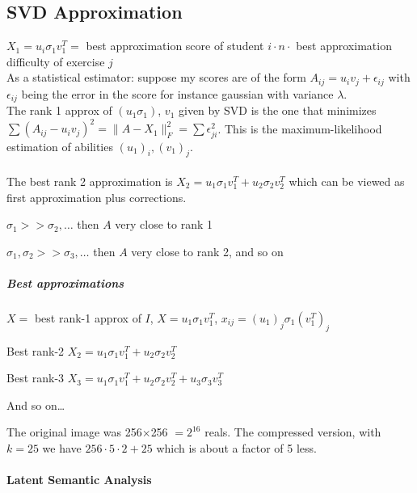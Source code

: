 \documentclass[10pt]{report}
\begin{document}
\subsection{SVD Approximation} $X_1 = u_i\sigma_1 v_1^T =$ best approximation score of student $i \cdot n \cdot$ best approximation difficulty of exercise $j$\\
As a statistical estimator: suppose my scores are of the form $A_{ij} = u_i v_j + \epsilon_{ij}$ with $\epsilon_{ij}$ being the error in the score for instance gaussian with variance $\lambda$.\\
The rank 1 approx of $(u_1\sigma_1)$, $v_1$ given by SVD is the one that minimizes $\sum (A_{ij} - u_iv_j)^2 = \|A-X_1\|_F^2 = \sum \epsilon_{ji}^2$. This is the maximum-likelihood estimation of abilities $(u_1)_i, (v_1)_j$.\\\\
The best rank 2 approximation is $X_2 = u_1\sigma_1 v_1^T + u_2\sigma_2 v_2^T$ which can be viewed as first approximation plus corrections.
\begin{list}{}{}
	\item $\sigma_1 >> \sigma_2,\ldots$ then $A$ very close to rank 1
	\item $\sigma_1, \sigma_2 >> \sigma_3,\ldots$ then $A$ very close to rank 2, and so on
\end{list}
\subparagraph{Best approximations} 
\begin{list}{}{}
	\item $X =$ best rank-1 approx of $I$, $X = u_1\sigma_1 v_1^T$, $x_{ij} = (u_1)_j \sigma_1 (v_1^T)_j$
	\item Best rank-2 $X_2 = u_1\sigma_1 v_1^T + u_2 \sigma_2 v_2^T$
	\item Best rank-3 $X_3 = u_1\sigma_1 v_1^T + u_2 \sigma_2 v_2^T + u_3 \sigma_3 v_3^T$
	\item And so on\ldots
\end{list}
The original image was 256$\times$256 $= 2^{16}$ reals. The compressed version, with $k = 25$ we have $256\cdot5\cdot2 + 25$ which is about a factor of 5 less.
\paragraph{Latent Semantic Analysis}
\end{document}
